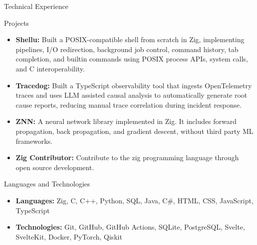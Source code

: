 \documentclass[]{mcdowellcv}
\begin{document}
\begin{cvsection}
    {Technical Experience}
    \begin{cvsubsection}
        {Projects}
        {}
        {}
        \begin{itemize}
            \item {\textbf{Shellu:}
                    Built a POSIX-compatible shell from scratch in
                    Zig, implementing pipelines, I/O redirection,
                    background job control, command history, tab
                    completion, and builtin commands using POSIX
                    process APIs, system calls, and C interoperability.
                }
            \item {\textbf{Tracedog:}
                    Built a TypeScript observability tool that
                    ingests OpenTelemetry traces and uses
                    LLM assisted causal analysis to automatically
                    generate root cause reports, reducing manual
                    trace correlation during incident response.
                }
            \item {\textbf{ZNN:}
                    A neural network library implemented in Zig. It
                    includes forward propagation, back propagation,
                    and gradient descent, without third party ML frameworks.
                }
            \item {\textbf{Zig Contributor:}
                    Contribute to the zig programming language
                    through open source development.
                }
        \end{itemize}
    \end{cvsubsection}
\end{cvsection}

\begin{cvsection}
    {Languages and Technologies}
    \begin{cvsubsection}
        {}
        {}
        {}
        \begin{itemize}
            \item {\textbf{Languages:}
                    Zig, C, C++, Python, SQL, Java, C\#, HTML, CSS,
                    JavaScript, TypeScript
                }
            \item {\textbf{Technologies:}
                    Git, GitHub, GitHub Actions, SQLite, PostgreSQL,
                    Svelte, SvelteKit, Docker, PyTorch, Qiskit
                }
        \end{itemize}
    \end{cvsubsection}
\end{cvsection}
\end{document}
